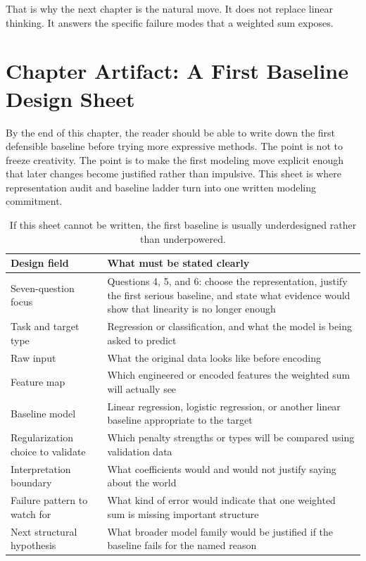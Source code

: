That is why the next chapter is the natural move. It does not replace linear thinking. It answers the specific failure modes that a weighted sum exposes.

\section{Chapter Artifact: A First Baseline Design Sheet}

By the end of this chapter, the reader should be able to write down the first defensible baseline before trying more expressive methods. The point is not to freeze creativity. The point is to make the first modeling move explicit enough that later changes become justified rather than impulsive. This sheet is where representation audit and baseline ladder turn into one written modeling commitment.

\begin{table}[t]
\centering
\small
\setlength{\tabcolsep}{4pt}
\begin{tabular}{p{3.23cm}p{7.0cm}}
\toprule
Design field & What must be stated clearly \\
\midrule
Seven-question focus & Questions 4, 5, and 6: choose the representation, justify the first serious baseline, and state what evidence would show that linearity is no longer enough \\
Task and target type & Regression or classification, and what the model is being asked to predict \\
Raw input & What the original data looks like before encoding \\
Feature map & Which engineered or encoded features the weighted sum will actually see \\
Baseline model & Linear regression, logistic regression, or another linear baseline appropriate to the target \\
Regularization choice to validate & Which penalty strengths or types will be compared using validation data \\
Interpretation boundary & What coefficients would and would not justify saying about the world \\
Failure pattern to watch for & What kind of error would indicate that one weighted sum is missing important structure \\
Next structural hypothesis & What broader model family would be justified if the baseline fails for the named reason \\
\bottomrule
\end{tabular}
\caption{If this sheet cannot be written, the first baseline is usually underdesigned rather than underpowered.}
\label{tab:baseline-design-sheet}
\end{table}

